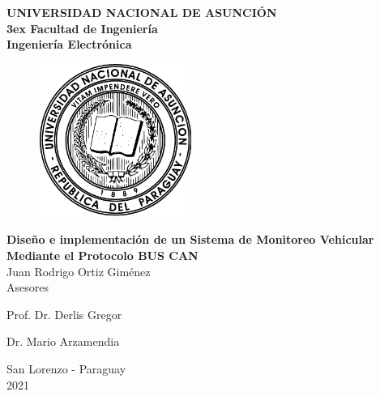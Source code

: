 \pagestyle{empty} %
\begin{center}
\textbf{\LARGE UNIVERSIDAD NACIONAL DE ASUNCIÓN\\
\parskip 3ex
\Large Facultad de Ingeniería\\
\vspace{1ex}
\Large Ingeniería Electrónica\\} 

\vspace{2cm}
\begin{figure}[h]
	\centering
		\includegraphics[height=50mm, width = 50mm]{./imagenes/escudouna.pdf}
	\label{fig:escudouna}
\end{figure}
\vspace{33pt}
\textbf{\large Diseño e implementación de un Sistema de Monitoreo Vehicular Mediante el Protocolo BUS CAN\\}
\vspace{15mm}
Juan Rodrigo Ortiz Giménez \\

\vspace{10mm} %
Asesores

Prof. Dr. Derlis Gregor

Dr. Mario Arzamendia



San Lorenzo - Paraguay\\
2021
\end{center}